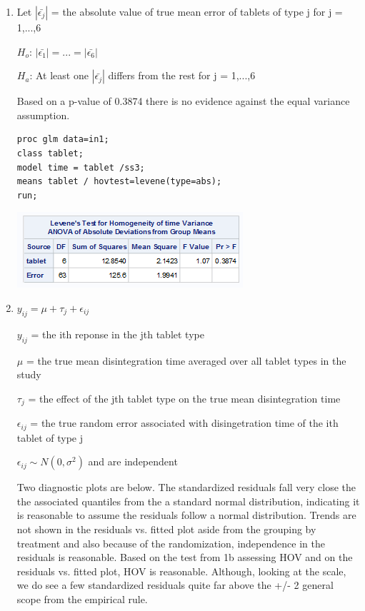 \documentclass{article}\usepackage[]{graphicx}\usepackage[]{color}
\begin{document}
\begin{enumerate}
\begin{enumerate}
\item 

Let $|\bar{\epsilon_{j}}|$ = the absolute value of true mean error of tablets of type j for j = 1,...,6

$H_{o}$: $|\bar{\epsilon_{1}}| = ... = |\bar{\epsilon_{6}}|$

$H_{a}$: At least one $|\bar{\epsilon_{j}}|$ differs from the rest for j = 1,...,6

Based on a p-value of 0.3874 there is no evidence against the equal variance assumption.

\begin{verbatim}
proc glm data=in1;
class tablet;
model time = tablet /ss3;
means tablet / hovtest=levene(type=abs);
run;
\end{verbatim}

\includegraphics{prob1b}

\item

$y_{ij} = \mu + \tau_{j} + \epsilon_{ij}$

$y_{ij}$ = the ith reponse in the jth tablet type

$\mu$ = the true mean disintegration time averaged over all tablet types in the study

$\tau_{j}$ = the effect of the jth tablet type on the true mean disintegration time

$\epsilon_{ij}$ = the true random error associated with disingetration time of the ith tablet of type j

$\epsilon_{ij} \sim N(0,\sigma^{2})$ and are independent

Two diagnostic plots are below. The standardized residuals fall very close the the associated quantiles from the a standard normal distribution, indicating it is reasonable to assume the residuals follow a normal distribution. Trends are not shown in the residuals vs. fitted plot aside from the grouping by treatment and also because of the randomization, independence in the residuals is reasonable. Based on the test from 1b assessing HOV and on the residuals vs. fitted plot, HOV is reasonable. Although, looking at the scale, we do see a few standardized residuals quite far above the +/- 2 general scope from the empirical rule.


\end{enumerate}
\end{enumerate}
\end{document}
